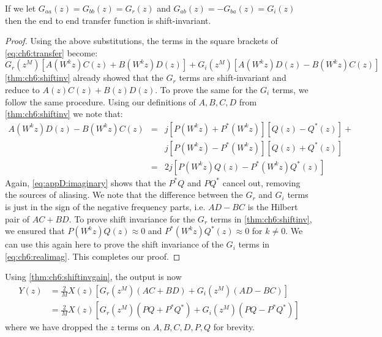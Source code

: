 \begin{theorem}\label{thm:ch6:shiftinvgain}
  If we let $G_{aa}(z) = G_{bb}(z) = G_r(z)$ and $G_{ab}(z) = -G_{ba}(z) = G_i(z)$
  then the end to end transfer function is shift-invariant. 
\end{theorem}
\begin{proof}
  Using the above substitutions, the terms in the square brackets of
  \eqref{eq:ch6:transfer} become:
  \begin{equation}\label{eq:ch6:realimag}
    G_r(z^M)\left[A(W^kz)C(z) + B(W^kz)D(z)\right] + G_i(z^M)\left[A(W^kz)D(z) - B(W^kz)C(z)\right]
  \end{equation}
  \autoref{thm:ch6:shiftinv} already showed that the $G_r$ terms are shift-invariant 
  and reduce to $A(z)C(z) + B(z)D(z)$. To prove the same for the $G_i$
  terms, we follow the same procedure. Using our definitions of $A, B, C, D$
  from \autoref{thm:ch6:shiftinv} we note that:
  \begin{eqnarray}
    A(W^kz)D(z) - B(W^kz)C(z) &=& j\left[P(W^kz) + P^*(W^kz)\right]\left[Q(z) -Q^*(z)\right] +\\
                              &&j\left[P(W^kz) -P^*(W^kz)\right]\left[Q(z) + Q^*(z)\right] \\
                              &=& 2j\left[P(W^kz)Q(z) - P^*(W^kz)Q^*(z)\right] \label{eq:appD:imaginary}
  \end{eqnarray}
  Again, \eqref{eq:appD:imaginary} shows that the $P^*Q$ and $PQ^*$ cancel out,
  removing the sources of aliasing.
  We note that the difference
  between the $G_r$ and $G_i$ terms is just in the sign of the negative
  frequency parts, i.e. $AD - BC$ is the Hilbert pair of $AC+BD$. To prove shift
  invariance for the $G_r$ terms in \autoref{thm:ch6:shiftinv}, we ensured that
  $P(W^kz)Q(z) \approx 0$ and $P^*(W^kz)Q^*(z) \approx 0$ for $k\neq 0$. We can
  use this again here to prove the shift invariance of the $G_i$ terms in
  \eqref{eq:ch6:realimag}. This completes our proof.
\end{proof}

Using \autoref{thm:ch6:shiftinvgain}, the output is now
\begin{align}
  Y(z) &= \frac{2}{M} X(z) \left[G_r(z^{M}) \left(AC + BD\right)
  + G_i(z^{M}) \left(AD - BC\right) \right] \\
  &= \frac{2}{M}X(z)\left[G_r(z^{M}) \left(PQ + P^*Q^*\right)
  + G_i(z^{M}) \left(PQ - P^*Q^*\right) \right]  \label{eq:ch6:end2end}
\end{align}
where we have dropped the $z$ terms on $A, B, C, D, P, Q$ for brevity.

